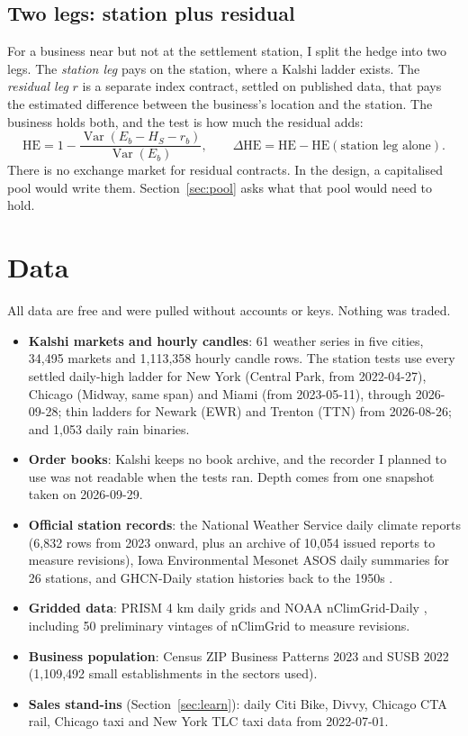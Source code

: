 \documentclass[11pt]{article}
\newcommand{\dHE}{\Delta\mathrm{HE}}
\begin{document}
\subsection{Two legs: station plus residual}

For a business near but not at the settlement station, I split the hedge into two legs. The \emph{station leg} pays on the station, where a Kalshi ladder exists. The \emph{residual leg} $r$ is a separate index contract, settled on published data, that pays the estimated difference between the business's location and the station. The business holds both, and the test is how much the residual adds:
\begin{equation}
\mathrm{HE} = 1 - \frac{\operatorname{Var}(E_b - H_S - r_b)}{\operatorname{Var}(E_b)}, \qquad \dHE = \mathrm{HE} - \mathrm{HE}(\text{station leg alone}).
\end{equation}
There is no exchange market for residual contracts. In the design, a capitalised pool would write them. Section~\ref{sec:pool} asks what that pool would need to hold.

\section{Data}
\label{sec:data}

All data are free and were pulled without accounts or keys. Nothing was traded.

\begin{itemize}
\item \textbf{Kalshi markets and hourly candles}: 61 weather series in five cities, 34,495 markets and 1,113,358 hourly candle rows. The station tests use every settled daily-high ladder for New York (Central Park, from 2022-04-27), Chicago (Midway, same span) and Miami (from 2023-05-11), through 2026-09-28; thin ladders for Newark (EWR) and Trenton (TTN) from 2026-08-26; and 1,053 daily rain binaries.
\item \textbf{Order books}: Kalshi keeps no book archive, and the recorder I planned to use was not readable when the tests ran. Depth comes from one snapshot taken on 2026-09-29.
\item \textbf{Official station records}: the National Weather Service daily climate reports (6,832 rows from 2023 onward, plus an archive of 10,054 issued reports to measure revisions), Iowa Environmental Mesonet ASOS daily summaries for 26 stations, and GHCN-Daily station histories back to the 1950s \citep{menne2012}.
\item \textbf{Gridded data}: PRISM 4 km daily grids \citep{daly2008} and NOAA nClimGrid-Daily \citep{durre2022}, including 50 preliminary vintages of nClimGrid to measure revisions.
\item \textbf{Business population}: Census ZIP Business Patterns 2023 and SUSB 2022 (1,109,492 small establishments in the sectors used).
\item \textbf{Sales stand-ins} (Section~\ref{sec:learn}): daily Citi Bike, Divvy, Chicago CTA rail, Chicago taxi and New York TLC taxi data from 2022-07-01.
\end{itemize}
\end{document}
